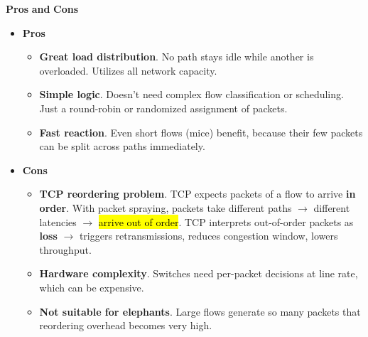 \highspace
\begin{flushleft}
    \textcolor{Green3}{ \textbf{Pros}} \textbf{and} \textcolor{Red2}{ \textbf{Cons}}
\end{flushleft}
\begin{itemize}
    \item[\textcolor{Green3}{\faIcon{check-circle}}] \textcolor{Green3}{\textbf{Pros}}
    \begin{itemize}
        \item[\textcolor{Green3}{\faIcon{check}}] \textcolor{Green3}{\textbf{Great load distribution}}. No path stays idle while another is overloaded. Utilizes all network capacity.
        \item[\textcolor{Green3}{\faIcon{check}}] \textcolor{Green3}{\textbf{Simple logic}}. Doesn't need complex flow classification or scheduling. Just a round-robin or randomized assignment of packets.
        \item[\textcolor{Green3}{\faIcon{check}}] \textcolor{Green3}{\textbf{Fast reaction}}. Even short flows (mice) benefit, because their few packets can be split across paths immediately.
    \end{itemize}
    \item[\textcolor{Red2}{\faIcon{times-circle}}] \textcolor{Red2}{\textbf{Cons}}
    \begin{itemize}
        \item[\textcolor{Red2}{\faIcon{times}}] \textcolor{Red2}{\textbf{TCP reordering problem}}. TCP expects packets of a flow to arrive \textbf{in order}. With packet spraying, packets take different paths $\rightarrow$ different latencies $\rightarrow$ \hl{arrive out of order}. TCP interprets out-of-order packets as \textbf{loss} $\rightarrow$ triggers retransmissions, reduces congestion window, lowers throughput.
        \item[\textcolor{Red2}{\faIcon{times}}] \textcolor{Red2}{\textbf{Hardware complexity}}. Switches need per-packet decisions at line rate, which can be expensive.
        \item[\textcolor{Red2}{\faIcon{times}}] \textcolor{Red2}{\textbf{Not suitable for elephants}}. Large flows generate so many packets that reordering overhead becomes very high.
    \end{itemize}
\end{itemize}

